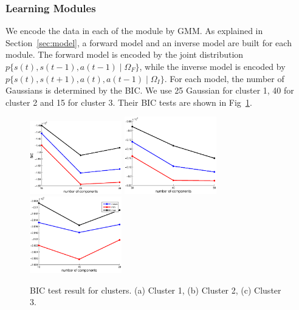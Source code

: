 
\subsubsection{Learning Modules}
\label{sec:module}
We encode the data in each of the module by GMM. As explained in Section~\ref{sec:model}, a forward model and an inverse model are built for each module. The forward model is encoded by the joint distribution $p\{s(t),s(t-1),a(t-1)\mid\Omega_F\}$, while the inverse model is encoded by $p\{s(t),s(t+1),a(t),a(t-1)\mid\Omega_I\}$. For each model, the number of Gaussians is determined by the BIC. We use 25 Gaussian for cluster 1, 40 for cluster 2 and 15 for cluster 3. Their BIC tests are shown in Fig~\ref{fig:bic}.

\begin{figure}
  \centering
  \includegraphics[width=4cm]{./fig/bic_cluster1.eps}
  \includegraphics[width=4cm]{./fig/bic_cluster2.eps}
  \includegraphics[width=4cm]{./fig/bic_cluster3.eps}
  \caption{ \scriptsize{BIC test result for clusters. (a) Cluster 1, (b) Cluster 2, (c) Cluster 3.}
}

\label{fig:bic}
\end{figure}

